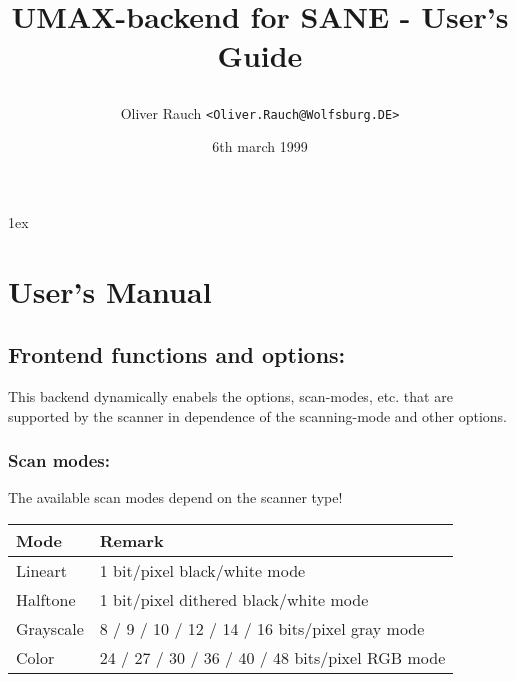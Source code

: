 \parindent0pt
\parskip1ex
\oddsidemargin-8mm
\evensidemargin-12mm
\topmargin-30mm
\textwidth17.3cm


\title{
 \begin{figure}[h]
  \centerline{\epsfxsize=9cm }
  \centerline{\epsfxsize=4cm }
 \end{figure}
 UMAX-backend for SANE - User's Guide }

\author{Oliver Rauch
{\tt <Oliver.Rauch@Wolfsburg.DE>}}
\date{6th march 1999}




\maketitle


\newpage
\tableofcontents

\newpage
\section{User's Manual}

\subsection{Frontend functions and options:}

This backend dynamically enabels the options, scan-modes, etc. that are
supported by the scanner in dependence of the scanning-mode and other options.


 \begin{figure}[h]
   \centerline
   {
     \epsfysize=12cm 
     \epsfysize=12cm 
    }
 \end{figure}



\subsubsection{Scan modes:}

The available scan modes depend on the scanner type!\\

\small
\begin{tabular}{|l|l|}
\hline
Mode&Remark\\
\hline
\hline
Lineart&1 bit/pixel black/white mode\\
Halftone&1 bit/pixel dithered black/white mode\\
Grayscale&8 / 9 / 10 / 12 / 14 / 16 bits/pixel gray mode\\
Color&24 / 27 / 30 / 36 / 40 / 48 bits/pixel RGB mode\\
\hline
\end{tabular}
\normalsize


